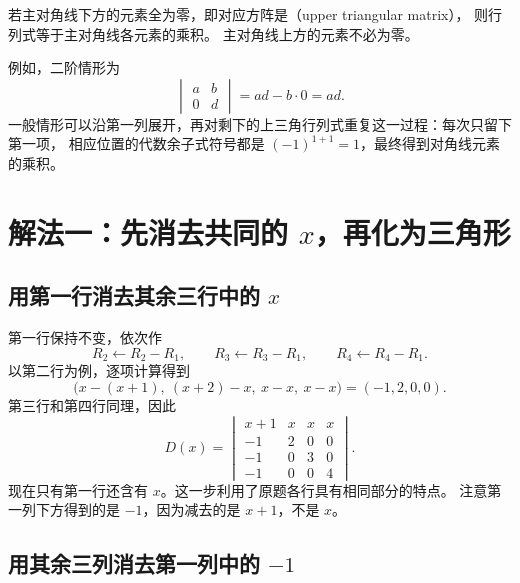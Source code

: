 \documentclass[UTF8,12pt,a4paper,fontset=fandol]{ctexart}
\begin{document}
\begin{property}[三角行列式]
\label{prop:triangular}
若主对角线下方的元素全为零，即对应方阵是（upper triangular matrix），
则行列式等于主对角线各元素的乘积。
主对角线上方的元素不必为零。
\end{property}

例如，二阶情形为
\[
  \begin{vmatrix}a&b\\0&d\end{vmatrix}=ad-b\cdot0=ad.
\]
一般情形可以沿第一列展开，再对剩下的上三角行列式重复这一过程：每次只留下第一项，
相应位置的代数余子式符号都是 $(-1)^{1+1}=1$，最终得到对角线元素的乘积。

\section{解法一：先消去共同的 $x$，再化为三角形}
\label{sec:elimination}

\subsection{用第一行消去其余三行中的 $x$}

第一行保持不变，依次作
\[
  R_2\leftarrow R_2-R_1,\qquad
  R_3\leftarrow R_3-R_1,\qquad
  R_4\leftarrow R_4-R_1.
\]
以第二行为例，逐项计算得到
\[
  \bigl(x-(x+1),\ (x+2)-x,\ x-x,\ x-x\bigr)
  =(-1,2,0,0).
\]
第三行和第四行同理，因此
\begin{equation}
  D(x)=\begin{vmatrix}
    x+1&x&x&x\\
    -1&2&0&0\\
    -1&0&3&0\\
    -1&0&0&4
  \end{vmatrix}.
  \label{eq:row-reduced}
\end{equation}
现在只有第一行还含有 $x$。这一步利用了原题各行具有相同部分的特点。
注意第一列下方得到的是 $-1$，因为减去的是 $x+1$，不是 $x$。

\subsection{用其余三列消去第一列中的 $-1$}
\end{document}
